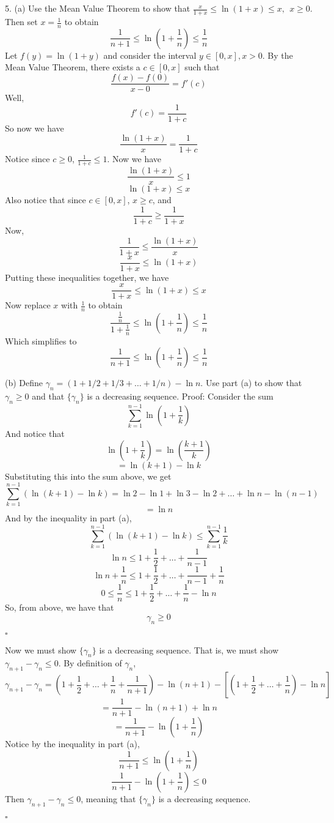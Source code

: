 \documentclass{article}
\begin{document}
\section{}
5. (a) Use the Mean Value Theorem to show that $\frac{x}{1+x} \leq \ln{(1+x)} \leq x, \:\: x \geq 0$. Then set $x = \frac{1}{n}$ to obtain
\[\frac{1}{n+1} \leq \ln{(1+\frac{1}{n})} \leq \frac{1}{n}\]
Let $f(y) =\ln{(1+y)}$ and consider the interval $y \in [0, x], x > 0$. By the Mean Value Theorem, there exists a $c \in [0,x]$ such that
\[\frac{f(x) - f(0)}{x - 0} = f'(c)\]
Well, 
\[f'(c) = \frac{1}{1+c}\]
So now we have
\[\frac{\ln{(1+x)}}{x} = \frac{1}{1+c}\]
Notice since $c \geq 0$, $\frac{1}{1+c} \leq 1$. Now we have
\[\frac{\ln{(1+x)}}{x} \leq 1\]
\[\ln{(1+x)} \leq x\]
Also notice that since $c \in [0,x]$, $x \geq c$, and 
\[\frac{1}{1+c} \geq \frac{1}{1+x}\]
Now,
\[\frac{1}{1+x} \leq \frac{\ln{(1+x)}}{x}\]
\[\frac{x}{1+x} \leq \ln{(1+x)}\]
Putting these inequalities together, we have
\[\frac{x}{1+x} \leq \ln{(1+x)} \leq x\]
Now replace $x$ with $\frac{1}{n}$ to obtain
\[\frac{\frac{1}{n}}{1+\frac{1}{n}} \leq \ln{(1+\frac{1}{n})} \leq \frac{1}{n}\]
Which simplifies to 
\[\frac{1}{n+1} \leq \ln{(1+\frac{1}{n})} \leq \frac{1}{n}\]


(b) Define $\gamma_n = (1 + 1/2 + 1/3 + \ldots + 1/n) - \ln{n}$. Use part (a) to show that $\gamma_n \geq 0$ and that $\{\gamma_n\}$ is a decreasing sequence.
\newline\newline
Proof: Consider the sum
\[\sum_{k=1}^{n-1} \ln{(1+\frac{1}{k})}\]
And notice that 
\[\ln{(1+\frac{1}{k})} = \ln{(\frac{k+1}{k})}\]
\[= \ln{(k+1)} - \ln{k}\]
Substituting this into the sum above, we get
\[\sum_{k=1}^{n-1} (\ln{(k+1)} - \ln{k}) = \ln{2} - \ln{1} + \ln{3} - \ln{2} + \ldots + \ln{n} - \ln{(n-1)} \]
\[= \ln{n}\]
And by the inequality in part (a), 
\[\sum_{k=1}^{n-1}(\ln{(k+1)}-\ln{k}) \leq \sum_{k=1}^{n-1} \frac{1}{k}\]
\[\ln{n} \leq 1 + \frac{1}{2} + \ldots + \frac{1}{n-1}\]
\[\ln{n} + \frac{1}{n} \leq 1 + \frac{1}{2} + \ldots + \frac{1}{n-1} + \frac{1}{n}\]
\[0 \leq \frac{1}{n} \leq 1 + \frac{1}{2} + \ldots + \frac{1}{n} - \ln{n}\]
So, from above, we have that 
\[\gamma_n \geq 0\]
\begin{flushright}
    $\square$
\end{flushright}
Now we must show $\{\gamma_n\}$ is a decreasing sequence. That is, we must show $\gamma_{n+1} - \gamma_n \leq 0$. By definition of $\gamma_n$, 
\[\gamma_{n+1} - \gamma_n = (1 + \frac{1}{2} + \ldots + \frac{1}{n} + \frac{1}{n+1}) - \ln{(n+1)} - [(1+\frac{1}{2} + \ldots + \frac{1}{n}) - \ln{n}]\]
\[=\frac{1}{n+1} - \ln{(n+1)} + \ln{n}\]
\[=\frac{1}{n+1} - \ln{(1+\frac{1}{n})}\]
Notice by the inequality in part (a),
\[\frac{1}{n+1} \leq \ln{(1+\frac{1}{n})}\]
\[\frac{1}{n+1} - \ln{(1+\frac{1}{n})} \leq 0\]
Then $\gamma_{n+1} - \gamma_n \leq 0$, meaning that $\{\gamma_n\}$ is a decreasing sequence.
\begin{flushright}
    $\square$
\end{flushright}
\end{document}
